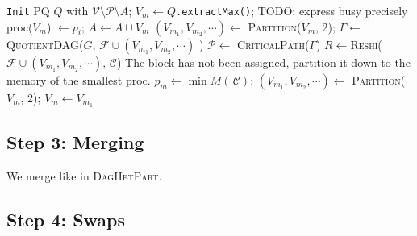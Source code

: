 \documentclass[11pt]{article}
\newcommand{\algo}[1]{\textsc{#1}}
\newcommand{\daghetpart}{\algo{DagHetPart}\xspace}
\newcommand{\reshi}{\algo{Reshi}\xspace}
\newcommand{\criticalpath}{\mathcal{P}}
\newcommand{\cluster}{\,\mathcal{C}}
\begin{document}
\begin{algorithm}[tb]
\begin{algorithmic}[1]
                        \EndIf
                    \EndWhile
                \EndFor

                \For{$\nu \in \mathcal{V} \setminus \criticalpath \setminus A $} \label{line:notcritical}
                    \State \texttt{Init} PQ $Q$ with $\mathcal{V} \setminus \criticalpath \setminus A$;
                        \State $V_{m} \gets Q$\texttt{.extractMax()};
                                \Comment TODO: express busy precisely
                                    \State proc($V_m$) $\gets p_i$; $A\gets A \cup {V_m}$
                                \Else
                                    \State $(V_{m_1}, V_{m_2}, \cdots) \gets $ \algo{Partition}($V_m$, 2);
                                    \State $\Gamma \gets $ \algo{QuotientDAG}($G$, $\mathcal{F} \cup (V_{m_1}, V_{m_2}, \cdots)$ )
                                    \State $\criticalpath \gets $ \algo{CriticalPath}($\Gamma$)
                                    \State $R\gets$\reshi($\mathcal{F} \cup (V_{m_1}, V_{m_2}, \cdots), \cluster$)
                                \EndIf
                            \EndIf
                        \EndFor
                         \Comment The block has not been assigned, partition it down to the memory of the smallest proc.
                        \State  $p_{m} \gets {\min}M(\cluster)$;
                            \State $(V_{m_1}, V_{m_2}, \cdots) \gets $ \algo{Partition}($V_m$, 2);
                            \State $V_m \gets V_{m_1}$
                        \EndWhile

                        \EndIf
                    \EndWhile
                \EndFor \label{line:end}
            \EndProcedure
        \end{algorithmic}
    \end{algorithm}

    \subsection*{Step 3: Merging}

    We merge like in \daghetpart.

    \subsection*{Step 4: Swaps}
\end{document}
